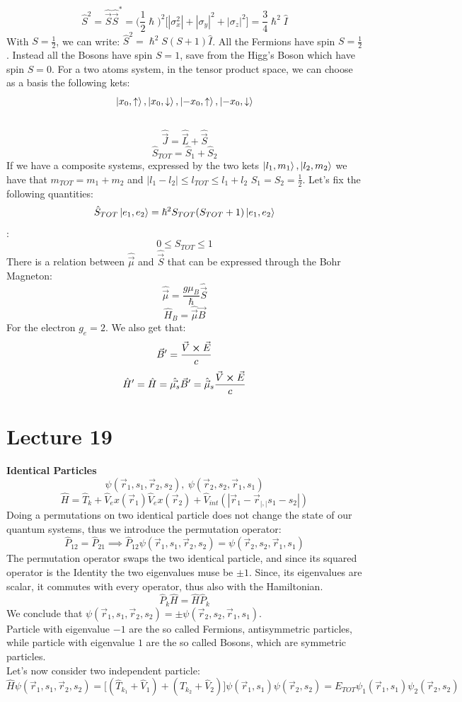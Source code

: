 \documentclass{article}
\begin{document}
$$ \hat{S}^2 = \hat{\Vec{S}}\hat{\Vec{S}}^* = \biggl( \frac{1}{2} \hslash \biggl)^2 \bigl[ |\sigma_x^2|+ |\sigma_y|^2+ |\sigma_z|^2 \bigl] = \frac{3}{4} \hslash^2 \hat{I}$$
With $S = \frac{1}{2}$, we can write: $\hat{S}^2 = \hslash^2 S(S+1)\hat{I}$.
All the Fermions have spin $S=\frac{1}{2}$. Instead all the Bosons have spin $ S = 1$, save from the Higg's Boson which have spin $S=0$.
For a two atoms system, in the tensor product space, we can choose as a basis the following kets:
$$\ket{x_0, \uparrow}, \ket{x_0, \downarrow}, \ket{-x_0, \uparrow}, \ket{-x_0, \downarrow}$$ \\
$$\hat{\Vec{J}} = \hat{\Vec{L}}+ \hat{\Vec{S}}$$
$$\hat{S}_{TOT} = \hat{S}_1 + \hat{S}_2$$
If we have a composite systems, expressed by the two kets $\ket{l_1,m_1}, \ket{l_2,m_2}$ we have that $m_{TOT} = m_1+m_2$ and $|l_1-l_2| \leq l_{TOT} \leq l_1+l_2$
$S_1 = S_2 = \frac{1}{2}$.
Let's fix the following quantities:$$\hat{S}_{TOT} \ket{e_1,e_2} = \hslash^2 S_{TOT} (S_{TOT}+1) \ket{e_1,e_2}$$:
$$0 \leq S_{TOT} \leq 1$$
There is a relation between $\hat{\Vec{\mu}}$ and $\hat{\Vec{S}}$ that can be expressed through the Bohr Magneton:
$$\hat{\Vec{\mu}} = \frac{g \mu_B}{\hslash} \hat{\Vec{S}}$$
$$\hat{H}_B = \hat{\Vec{\mu}}\Vec{B}$$
For the electron $g_e= 2$. We also get that:
$$\Vec{B}' = \frac{\Vec{V} \cross \Vec{E}}{c}$$
$$\hat{H}' = \hat{H} = \hat{\Vec{\mu_s}} \Vec{B}' = \hat{\Vec{\mu}}_s \frac{\Vec{V}\cross\Vec{E}}{c}$$

\section{Lecture 19}
\textbf{Identical Particles}
$$\psi(\Vec{r}_1, s_1,\Vec{r}_2,s_2),\ \psi(\Vec{r}_2,s_2,\Vec{r}_1,s_1)$$
$$\hat{H} = \hat{T}_k+ \hat{V}_ex(\Vec{r}_1) \hat{V}_ex(\Vec{r}_2)+ \hat{V}_{int}(|\Vec{r}_1-\Vec{r}_|,|s_1-s_2|)$$
Doing a permutations on two identical particle does not change the state of our quantum systems, thus we introduce the permutation operator:
$$\hat{P}_{12} = \hat{P}_{21} \implies \hat{P}_{12}\psi(\Vec{r}_1,s_1,\Vec{r}_2,s_2) = \psi(\Vec{r}_2,s_2,\vec{r}_1,s_1)$$
The permutation operator swaps the two identical particle, and since its squared operator is the Identity the two eigenvalues muse be $\pm 1$. Since, its eigenvalues are scalar, it commutes with every operator, thus also with the Hamiltonian.
$$\hat{P}_k \hat{H} = \hat{H}\hat{P}_k$$
We conclude that $\psi(\vec{r}_1,s_1,\vec{r}_2,s_2) = \pm \psi(\vec{r}_2,s_2,\vec{r}_1,s_1)$. \\
Particle with eigenvalue $-1$ are the so called Fermions, antisymmetric particles, while particle with eigenvalue $1$ are the so called Bosons, which are symmetric particles.\\
Let's now consider two independent particle:
$$\hat{H} \psi(\vec{r}_1,s_1,\vec{r}_2,s_2) = \bigl[ (\hat{T}_{k_1}+ \hat{V}_1) +(\hat{T}_{k_2}+ \hat{V}_2) \bigl] \psi(\vec{r}_1,s_1) \psi(\vec{r}_2,s_2) = E_{TOT}\psi_1(\vec{r}_1,s_1)\psi_2(\vec{r}_2,s_2) $$
\end{document}
